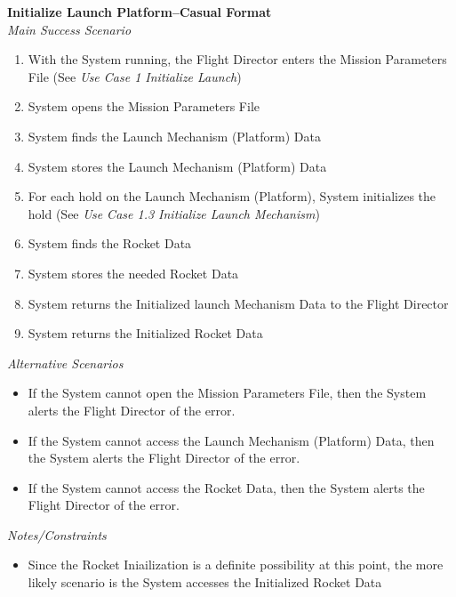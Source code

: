 \documentclass[letterpaper]{article}
\begin{document}
\noindent
\textbf{Initialize Launch Platform--Casual Format}\\
\textit{Main Success Scenario}\\
\begin{enumerate}
   \item With the System running, the Flight Director enters the
      Mission Parameters File (See \textit{Use Case 1 Initialize
      Launch})
   \item System opens the Mission Parameters File
   \item System finds the Launch Mechanism (Platform) Data
   \item System stores the Launch Mechanism (Platform) Data
   \item For each hold on the Launch Mechanism (Platform), System
      initializes the hold (See \textit{Use Case 1.3 Initialize
      Launch Mechanism})
   \item System finds the Rocket Data
   \item System stores the needed Rocket Data
   \item System returns the Initialized launch Mechanism Data to the
      Flight Director
   \item System returns the Initialized Rocket Data
\end{enumerate}
\textit{Alternative Scenarios}
\begin{itemize}
   \item[2a.]If the System cannot open the Mission Parameters File,
      then the System alerts the Flight Director of the error.
   \item[3a.]If the System cannot access the Launch Mechanism
      (Platform) Data, then the System alerts the Flight Director of
      the error.
   \item[6a.]If the System cannot access the Rocket Data, then the
      System alerts the Flight Director of the error.
\end{itemize}
\textit{Notes/Constraints}
\begin{itemize}
   \item[6a.,7a]Since the Rocket Iniailization is a definite
      possibility at this point, the more likely scenario is the
      System accesses the Initialized Rocket Data
\end{itemize}
\end{document}
